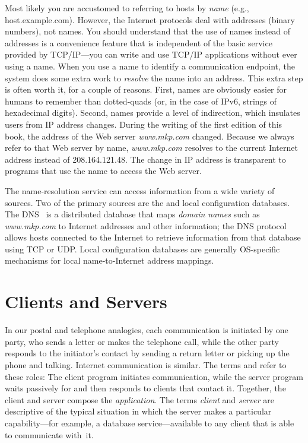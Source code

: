 Most likely you are accustomed to referring to hosts by \emph{name}
(e.g., host.example.com).  However, the Internet protocols deal with
addresses (binary numbers), not names.  You should understand that the use of
names instead of addresses is a convenience feature that is
independent of the basic service provided by TCP/IP---you can write
and use TCP/IP applications without ever using a name.  When you use a
name to identify a communication endpoint, the system  does some
extra work to \emph{resolve} the name into an address.
%
This extra step is often worth it, for a couple of reasons. First,
names are obviously easier for humans to remember than dotted-quads
(or, in the case of IPv6,  strings of hexadecimal digits).
Second, names provide a level of indirection, which insulates users
from IP address changes.  During the writing of the first edition of
this book, the address of the Web server \emph{www.mkp.com}\/
changed.
%
Because we always refer to that Web server by name,
\emph{www.mkp.com} resolves to the current Internet address instead
of 208.164.121.48.  The change in IP address is transparent to programs that use the
name to access the Web server.

The name-resolution service can access information from a wide variety
of sources.  Two of the primary sources are the  and local configuration databases.  The
DNS~\cite{RFC1034} is a distributed database that maps \emph{domain
names} such as \emph{www.mkp.com} to Internet addresses and other
information; the DNS protocol~\cite{RFC1035} allows hosts connected
to the Internet to retrieve information from that database using TCP
or UDP.  Local configuration databases are generally OS-specific
mechanisms for local name-to-Internet address mappings.

\section{Clients and Servers}

In our postal and telephone analogies, each communication
is initiated by one party, who sends a letter or makes the telephone
call, while the other party responds to the initiator's contact by
sending a return letter or picking up the phone and talking.  Internet
communication is similar.  The terms  and 
refer to these roles: The client program initiates communication,
while the server program waits passively for and then responds to
clients that contact it.  Together, the client and server compose the
\emph{application}.  The terms \emph{client} and \emph{server} are
descriptive of the typical situation in which the server makes a
particular capability---for example, a database service---available to
any client that is able to communicate with~it.

